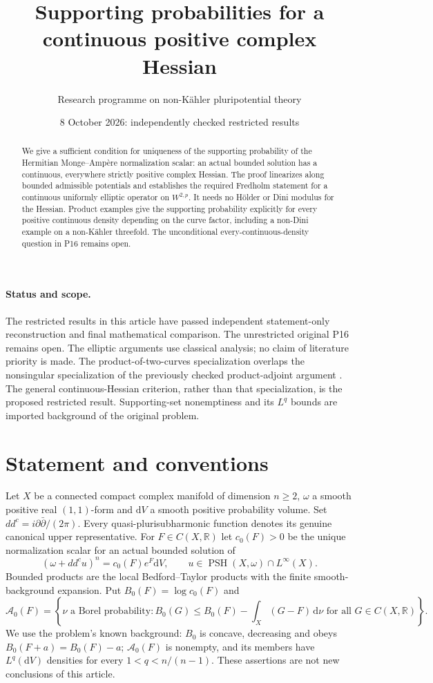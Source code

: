 \documentclass[11pt]{article}
\title{Supporting probabilities for a continuous positive complex Hessian}
\author{Research programme on non-K\"ahler pluripotential theory}
\date{8 October 2026: independently checked restricted results}
\newcommand{\ddc}{dd^c}
\newcommand{\PSH}{\operatorname{PSH}}
\newcommand{\cA}{\mathcal A}
\newcommand{\dV}{\mathrm dV}
\theoremstyle{remark}
\begin{document}
\maketitle
\begin{abstract}
We give a sufficient condition for uniqueness of the supporting probability
of the Hermitian Monge--Amp\`ere normalization scalar: an actual bounded
solution has a continuous, everywhere strictly positive complex Hessian.
The proof linearizes along bounded admissible potentials and establishes
the required Fredholm statement for a continuous uniformly elliptic
operator on $W^{2,p}$. It needs no H\"older or Dini modulus for the Hessian.
Product examples give the supporting probability explicitly for every
positive continuous density depending on the curve factor, including a
non-Dini example on a non-K\"ahler threefold. The unconditional
every-continuous-density question in P16 remains open.
\end{abstract}

\paragraph{Status and scope.}
The restricted results in this article have passed independent statement-only
reconstruction and final mathematical comparison. The unrestricted original
P16 remains open. The elliptic arguments use classical analysis;
no claim of literature priority is made. The product-of-two-curves
specialization overlaps the nonsingular specialization of the previously
checked product-adjoint argument \cite{S07}. The general continuous-Hessian
criterion, rather than that specialization, is the proposed restricted
result. Supporting-set nonemptiness and its $L^q$ bounds are imported
background of the original problem.

\section{Statement and conventions}
Let $X$ be a connected compact complex manifold of dimension $n\geq2$,
$\omega$ a smooth positive real $(1,1)$-form and $\dV$ a smooth positive
probability volume. Set $\ddc=i\partial\bar\partial/(2\pi)$.
Every quasi-plurisubharmonic function denotes its genuine canonical upper
representative. For $F\in C(X,\mathbb R)$ let $c_0(F)>0$ be the unique
normalization scalar for an actual bounded solution of
\begin{equation}\label{eq:equation}
 (\omega+\ddc u)^n=c_0(F)e^F\dV,
 \qquad u\in\PSH(X,\omega)\cap L^\infty(X).
\end{equation}
Bounded products are the local Bedford--Taylor products with the finite
smooth-background expansion. Put $B_0(F)=\log c_0(F)$ and
\begin{equation}\label{eq:support}
 \cA_0(F)=\left\{\nu\text{ a Borel probability}:
 B_0(G)\leq B_0(F)-\int_X(G-F)\,\mathrm d\nu
 \text{ for all }G\in C(X,\mathbb R)\right\}.
\end{equation}
We use the problem's known background: $B_0$ is concave, decreasing and
obeys $B_0(F+a)=B_0(F)-a$; $\cA_0(F)$ is nonempty, and its members have
$L^q(\dV)$ densities for every $1<q<n/(n-1)$. These assertions are not
new conclusions of this article.
\end{document}
